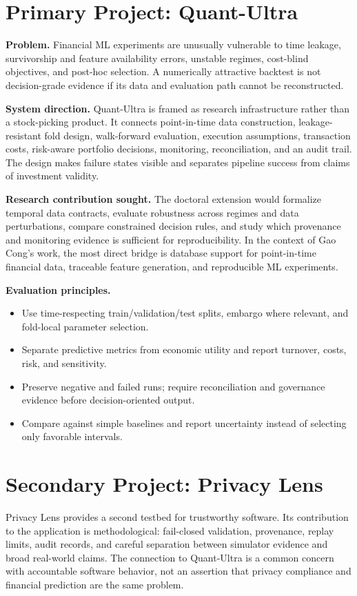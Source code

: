 \documentclass[11pt]{article}
\begin{document}
\section*{Primary Project: Quant-Ultra}
\textbf{Problem.} Financial ML experiments are unusually vulnerable to time leakage, survivorship and feature availability errors, unstable regimes, cost-blind objectives, and post-hoc selection. A numerically attractive backtest is not decision-grade evidence if its data and evaluation path cannot be reconstructed.

\textbf{System direction.} Quant-Ultra is framed as research infrastructure rather than a stock-picking product. It connects point-in-time data construction, leakage-resistant fold design, walk-forward evaluation, execution assumptions, transaction costs, risk-aware portfolio decisions, monitoring, reconciliation, and an audit trail. The design makes failure states visible and separates pipeline success from claims of investment validity.

\textbf{Research contribution sought.} The doctoral extension would formalize temporal data contracts, evaluate robustness across regimes and data perturbations, compare constrained decision rules, and study which provenance and monitoring evidence is sufficient for reproducibility. In the context of Gao Cong's work, the most direct bridge is database support for point-in-time financial data, traceable feature generation, and reproducible ML experiments.

\textbf{Evaluation principles.}
\begin{itemize}
\item Use time-respecting train/validation/test splits, embargo where relevant, and fold-local parameter selection.
\item Separate predictive metrics from economic utility and report turnover, costs, risk, and sensitivity.
\item Preserve negative and failed runs; require reconciliation and governance evidence before decision-oriented output.
\item Compare against simple baselines and report uncertainty instead of selecting only favorable intervals.
\end{itemize}

\section*{Secondary Project: Privacy Lens}
Privacy Lens provides a second testbed for trustworthy software. Its contribution to the application is methodological: fail-closed validation, provenance, replay limits, audit records, and careful separation between simulator evidence and broad real-world claims. The connection to Quant-Ultra is a common concern with accountable software behavior, not an assertion that privacy compliance and financial prediction are the same problem.
\end{document}
